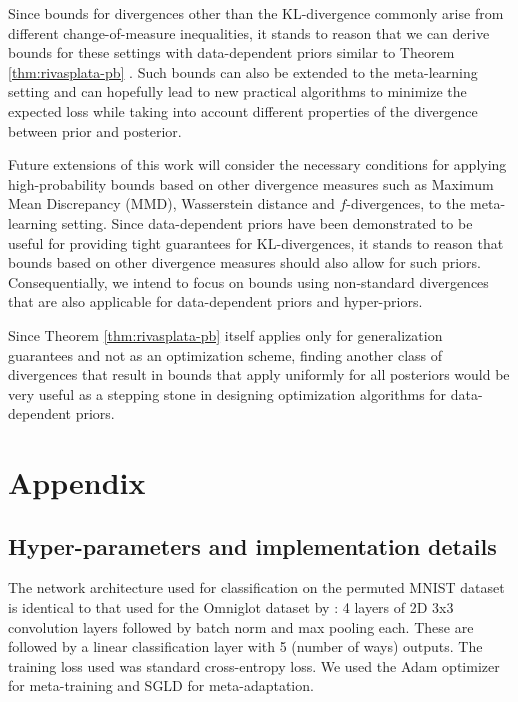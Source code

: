 \documentclass{article}
\theoremstyle{definition}
\begin{document}
Since bounds for divergences other than the KL-divergence commonly arise from different change-of-measure inequalities, it stands to reason that we can derive bounds for these settings with data-dependent priors similar to Theorem \ref{thm:rivasplata-pb} \citep{Rivasplata2020}. Such bounds can also be extended to the meta-learning setting and can hopefully lead to new practical algorithms to minimize the expected loss while taking into account different properties of the divergence between prior and posterior.

Future extensions of this work will consider the necessary conditions for applying high-probability bounds based on other divergence measures such as Maximum Mean Discrepancy (MMD), Wasserstein distance and $f$-divergences, to the meta-learning setting. 
Since data-dependent priors have been demonstrated \citep{Dziugaite2017, Perez-Ortiz2021} to be useful for providing tight guarantees for KL-divergences, it stands to reason that bounds based on other divergence measures should also allow for such priors.
Consequentially, we intend to focus on bounds using non-standard divergences that are also applicable for data-dependent priors and hyper-priors.

Since Theorem \ref{thm:rivasplata-pb} itself applies only for generalization guarantees and not as an optimization scheme, finding another class of divergences that result in bounds that apply uniformly for all posteriors would be very useful as a stepping stone in designing optimization algorithms for data-dependent priors.



\clearpage



\clearpage
\appendix
\section{Appendix}

\subsection{Hyper-parameters and implementation details} \label{append:hyper-params}

The network architecture used for classification on the permuted MNIST dataset is identical to that used for the Omniglot dataset by \citet{Vinyals2016}: 4 layers of 2D 3x3 convolution layers followed by batch norm and max pooling each. These are followed by a linear classification layer with 5 (number of ways) outputs. The training loss used was standard cross-entropy loss. We used the Adam optimizer for meta-training and SGLD for meta-adaptation.
\end{document}
